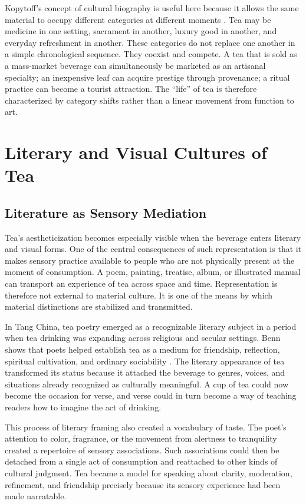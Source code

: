 \documentclass[numbers]{IntechOpen-Book}
\begin{document}
Kopytoff's concept of cultural biography is useful here because it allows the same material to occupy different categories at different moments \cite{kopytoff1986}. Tea may be medicine in one setting, sacrament in another, luxury good in another, and everyday refreshment in another. These categories do not replace one another in a simple chronological sequence. They coexist and compete. A tea that is sold as a mass-market beverage can simultaneously be marketed as an artisanal specialty; an inexpensive leaf can acquire prestige through provenance; a ritual practice can become a tourist attraction. The ``life'' of tea is therefore characterized by category shifts rather than a linear movement from function to art.

\section{Literary and Visual Cultures of Tea}

\subsection{Literature as Sensory Mediation}

Tea's aestheticization becomes especially visible when the beverage enters literary and visual forms. One of the central consequences of such representation is that it makes sensory practice available to people who are not physically present at the moment of consumption. A poem, painting, treatise, album, or illustrated manual can transport an experience of tea across space and time. Representation is therefore not external to material culture. It is one of the means by which material distinctions are stabilized and transmitted.

In Tang China, tea poetry emerged as a recognizable literary subject in a period when tea drinking was expanding across religious and secular settings. Benn shows that poets helped establish tea as a medium for friendship, reflection, spiritual cultivation, and ordinary sociability \cite{benn2015poetry}. The literary appearance of tea transformed its status because it attached the beverage to genres, voices, and situations already recognized as culturally meaningful. A cup of tea could now become the occasion for verse, and verse could in turn become a way of teaching readers how to imagine the act of drinking.

This process of literary framing also created a vocabulary of taste. The poet's attention to color, fragrance, or the movement from alertness to tranquility created a repertoire of sensory associations. Such associations could then be detached from a single act of consumption and reattached to other kinds of cultural judgment. Tea became a model for speaking about clarity, moderation, refinement, and friendship precisely because its sensory experience had been made narratable.
\end{document}
